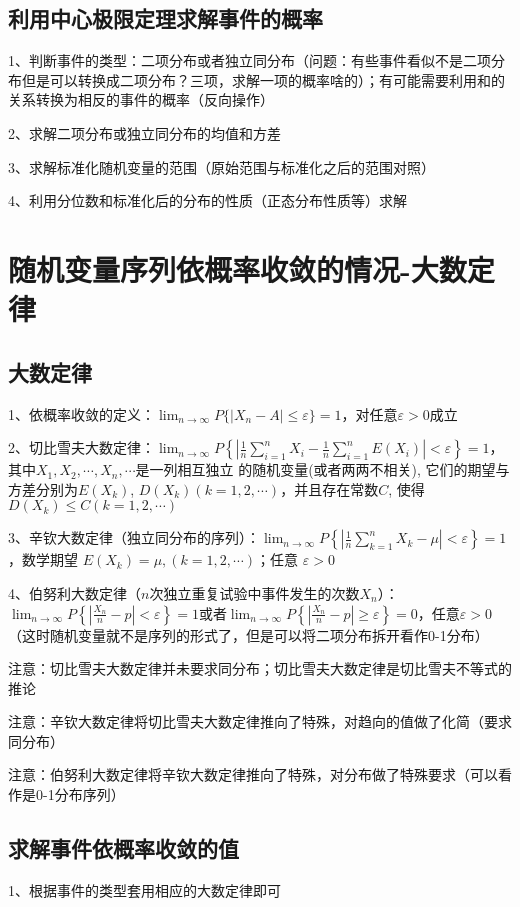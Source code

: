\subsection{利用中心极限定理求解事件的概率}

1、判断事件的类型：二项分布或者独立同分布（问题：有些事件看似不是二项分布但是可以转换成二项分布？三项，求解一项的概率啥的）；有可能需要利用和的关系转换为相反的事件的概率（反向操作）

2、求解二项分布或独立同分布的均值和方差

3、求解标准化随机变量的范围（原始范围与标准化之后的范围对照）

4、利用分位数和标准化后的分布的性质（正态分布性质等）求解

\section{随机变量序列依概率收敛的情况-大数定律}



\subsection{大数定律}

1、依概率收敛的定义：$ \lim_{n \rightarrow \infty} P\{|X_n-A| \le \varepsilon \}=1 $，对任意$ \varepsilon > 0 $成立

2、切比雪夫大数定律：$ \lim_{n \rightarrow \infty} P\left\{\left|\frac{1}{n} \sum_{i=1}^{n} X_{i}-\frac{1}{n} \sum_{i=1}^{n} E\left(X_{i}\right)\right|<\varepsilon\right\}=1 $，其中$ X_{1}, X_{2}, \cdots, X_{n}, \cdots $是一列相互独立 的随机变量(或者两两不相关), 它们的期望与方差分别为$ E\left(X_{k}\right) $, $ D\left(X_{k}\right)(k=1,2, \cdots) $，并且存在常数$ C $, 使得$ D\left(X_{k}\right) \leqslant C(k=1,2, \cdots) $

3、辛钦大数定律（独立同分布的序列）：$ \lim_{n \rightarrow \infty} P\left\{\left|\frac{1}{n} \sum_{k=1}^{n} X_{k}-\mu\right|<\varepsilon\right\}=1 $，数学期望 $ E\left(X_{k}\right)=\mu,(k=1,2, \cdots) $；任意 $ \varepsilon>0 $

4、伯努利大数定律（$ n $次独立重复试验中事件发生的次数$ X_n $）：$ \lim_{n \rightarrow \infty} P\left\{\left|\frac{X_n}{n}-p\right|<\varepsilon\right\}=1 $或者$ \lim_{n \rightarrow \infty} P\left\{\left|\frac{X_n}{n}-p\right| \geqslant \varepsilon\right\}=0 $，任意$ \varepsilon>0 $（这时随机变量就不是序列的形式了，但是可以将二项分布拆开看作0-1分布）

注意：切比雪夫大数定律并未要求同分布；切比雪夫大数定律是切比雪夫不等式的推论

注意：辛钦大数定律将切比雪夫大数定律推向了特殊，对趋向的值做了化简（要求同分布）

注意：伯努利大数定律将辛钦大数定律推向了特殊，对分布做了特殊要求（可以看作是0-1分布序列）



\subsection{求解事件依概率收敛的值}

1、根据事件的类型套用相应的大数定律即可

